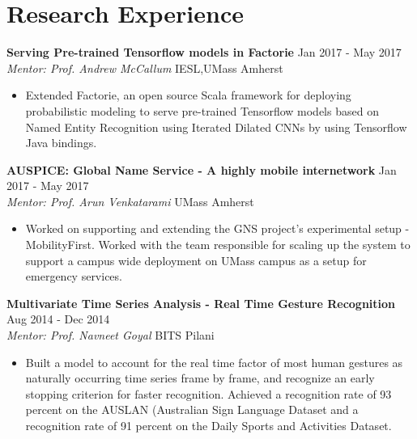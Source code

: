 \documentclass[letterpaper]{article}
\begin{document}
\section*{Research Experience}
\textbf{Serving Pre-trained Tensorflow models in Factorie}  \hfill
Jan 2017 - May 2017
\\ \emph{Mentor: Prof. Andrew McCallum} \hfill
IESL,UMass Amherst\\
\vspace{-7mm}
\begin{itemize}
\item Extended Factorie, an open source Scala framework for deploying probabilistic modeling to serve pre-trained Tensorflow models based on Named Entity Recognition using Iterated Dilated CNNs by using Tensorflow Java bindings.
\vspace{-2mm}
\end{itemize}
\vspace{1mm} 
\textbf{AUSPICE: Global Name Service - A highly mobile internetwork}  \hfill
Jan 2017 - May 2017
\\ \emph{Mentor: Prof. Arun Venkatarami} \hfill
UMass Amherst\\
\vspace{-7mm}
\begin{itemize}
\item Worked on supporting and extending the GNS project's experimental setup - MobilityFirst. Worked with the team responsible for scaling up the system to support a campus wide deployment on UMass campus as a setup for emergency services.
\end{itemize}
\vspace{-1mm} 
\textbf{Multivariate Time Series Analysis - Real Time Gesture Recognition}  \hfill
Aug 2014 - Dec 2014
\\ \emph{Mentor: Prof. Navneet Goyal} \hfill
BITS Pilani\\
\vspace{-7mm}
\begin{itemize}
\item Built a model to account for the real time factor of most human gestures as naturally occurring time series frame by frame, and recognize an early stopping criterion for faster recognition. Achieved a recognition rate of 93 percent on the AUSLAN (Australian Sign Language Dataset and a recognition rate of 91 percent on the Daily Sports and Activities Dataset.
\end{itemize}
\end{document}

